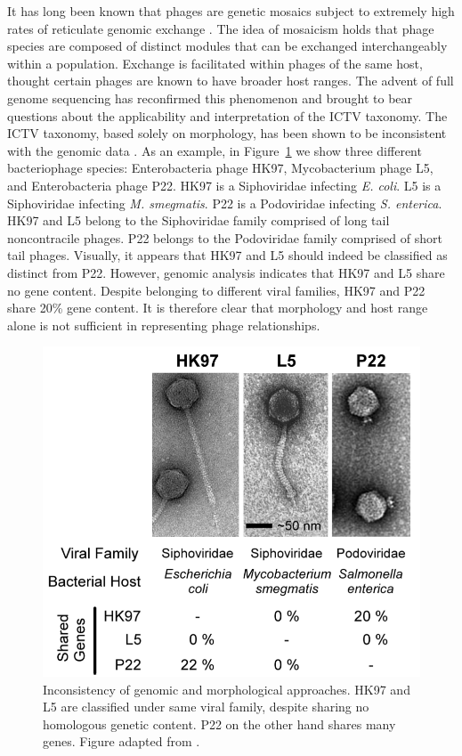It has long been known that phages are genetic mosaics subject to extremely high rates of reticulate genomic exchange \cite{Westmoreland:1969dd}.
The idea of mosaicism holds that phage species are composed of distinct modules that can be exchanged interchangeably within a population.
Exchange is facilitated within phages of the same host, thought certain phages are known to have broader host ranges.
The advent of full genome sequencing has reconfirmed this phenomenon and brought to bear questions about the applicability and interpretation of the ICTV taxonomy.
The ICTV taxonomy, based solely on morphology, has been shown to be inconsistent with the genomic data \cite{Lawrence:2002eg}.
As an example, in Figure~\ref{phage:fig:inconsistency} we show three different bacteriophage species: Enterobacteria phage HK97, Mycobacterium phage L5, and Enterobacteria phage P22.
HK97 is a Siphoviridae infecting \emph{E. coli}.
L5 is a Siphoviridae infecting \emph{M. smegmatis}.
P22 is a Podoviridae infecting \emph{S. enterica}.
HK97 and L5 belong to the Siphoviridae family comprised of long tail noncontracile phages.
P22 belongs to the Podoviridae family comprised of short tail phages.
Visually, it appears that HK97 and L5 should indeed be classified as distinct from P22.
However, genomic analysis indicates that HK97 and L5 share no gene content.
Despite belonging to different viral families, HK97 and P22 share 20\% gene content.
It is therefore clear that morphology and host range alone is not sufficient in representing phage relationships.

\begin{figure}
\centering
\includegraphics[width=.5\linewidth]{./fig/phage/LAWRENCE_phage_comparative.png}
\caption[Inconsistency of morphological classification in bacteriophage.]{Inconsistency of genomic and morphological approaches. HK97 and L5 are classified under same viral family, despite sharing no homologous genetic content. P22 on the other hand shares many genes. Figure adapted from \parencite{Lawrence:2002eg}.}
\label{phage:fig:inconsistency}
\end{figure}

